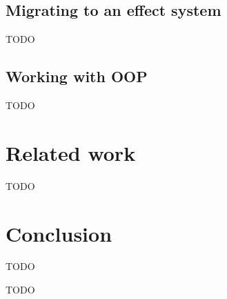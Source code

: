 \documentclass[acmsmall]{acmart}
\begin{document}
\subsection{Migrating to an effect system}

TODO %

\subsection{Working with OOP}

TODO %




\section{Related work} \label{sec:related}



TODO %



\section{Conclusion} \label{sec:conclusion}

TODO %


\begin{acks}
    TODO %
\end{acks}



\end{document}
